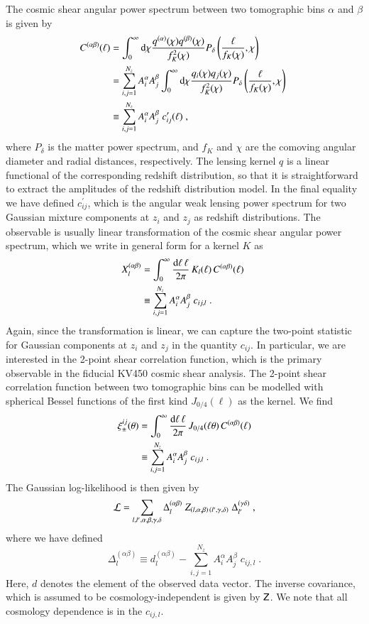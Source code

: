 \documentclass{aa}
\newcommand{\eq}[1]{\begin{equation}  #1 \end{equation}}
\newcommand{\eqa}[1]{\begin{align}   #1 \end{align}}
\newcommand{\br}[1]{\left( #1 \right)}
\newcommand{\nn}{\nonumber}
\newcommand{\dd}{{\rm d}}
\begin{document}
The cosmic shear angular power spectrum between two tomographic bins $\alpha$ and $\beta$ is given by
\eqa{
C^{(\alpha \beta)}(\ell) &= \int_0^\infty \dd \chi \frac{q^{(\alpha)}(\chi) q^{(\beta)}(\chi)}{f_K^2(\chi)} P_\delta\br{\frac{\ell}{f_K(\chi)},\chi}\; \\ \nn
&= \sum_{i,j=1}^{N_z} A_i^\alpha A_j^\beta  \int_0^\infty \dd \chi \frac{q_i(\chi) q_j(\chi)}{f_K^2(\chi)} P_\delta\br{\frac{\ell}{f_K(\chi)},\chi}\; \\ \nn
&\equiv \sum_{i,j=1}^{N_z} A_i^\alpha A_j^\beta\; c^\prime_{ij}(\ell)\;,
}
where $P_\delta$ is the matter power spectrum, and $f_K$ and $\chi$ are the comoving angular diameter and radial distances, respectively. The lensing kernel $q$ is a linear functional of the corresponding redshift distribution, so that it is straightforward to extract the amplitudes of the redshift distribution model. In the final equality we have defined $c^\prime_{ij}$, which is the angular weak lensing power spectrum for two Gaussian mixture components at $z_i$ and $z_j$ as redshift distributions. The observable is usually linear transformation of the cosmic shear angular power spectrum, which we write in general form for a kernel $K$ as
\eqa{
X_l^{(\alpha \beta)} &= \int_0^\infty \frac{\dd \ell\, \ell}{2 \pi}\, K_l(\ell)\, C^{(\alpha \beta)}(\ell)\; \\ \nn
&\equiv \sum_{i,j=1}^{N_z} A_i^\alpha A_j^\beta\; c_{ij,l}\;.
\label{eq:obs}
}
Again, since the transformation is linear, we can capture the two-point statistic for Gaussian components at $z_i$ and $z_j$ in the quantity $c_{ij}$.
In particular, we are interested in the 2-point shear correlation function, which is the primary observable in the fiducial KV450 cosmic shear analysis. The 2-point shear correlation function between two tomographic bins can be modelled with spherical Bessel functions of the first kind $J_{0/4}(\ell)$ as the kernel. We find
\eqa{
\xi_\pm^{ij}(\theta) &= \int_0^\infty \frac{\dd \ell\, \ell}{2 \pi}\,J _{0/4}(\ell \theta)\, C^{(\alpha \beta)}(\ell)\\ \nn
&\equiv \sum_{i,j=1}^{N_z} A_i^\alpha A_j^\beta\; c_{ij,l}\;.
}
The Gaussian log-likelihood is then given by
\eq{
{\cal L} = \sum_{l,l',\alpha,\beta,\gamma,\delta} \Delta_l^{(\alpha \beta)}\; Z_{(l,\alpha,\beta) \,  (l',\gamma,\delta)}\; \Delta_{l'}^{(\gamma \delta)}\;,
}
where we have defined
\eq{
\Delta_l^{(\alpha \beta)} \equiv d_l^{(\alpha \beta)} - \sum_{i,j=1}^{N_z} A_i^\alpha A_j^\beta\; c_{ij,l}\;.
}
Here, $d$ denotes the element of the observed data vector. The inverse covariance, which is assumed to be cosmology-independent is given by $\mathsf{Z}$. We note that all cosmology dependence is in the $c_{ij,l}$.
\end{document}
